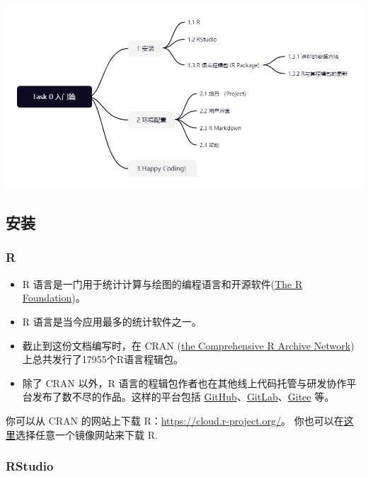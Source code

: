 \documentclass[]{ctexbook}
\providecommand{\tightlist}{%
  \setlength{\itemsep}{0pt}\setlength{\parskip}{0pt}}
\begin{document}
\includegraphics[width=1\textwidth,height=\textheight]{./image/task00_intro_structure.jpg}

\hypertarget{ux5b89ux88c5}{%
\subsection{安装}\label{ux5b89ux88c5}}

\hypertarget{r}{%
\subsubsection{R}\label{r}}

\begin{itemize}
\tightlist
\item
  R 语言是一门用于统计计算与绘图的编程语言和开源软件(\href{https://www.r-project.org/}{The R Foundation})。
\item
  R 语言是当今应用最多的统计软件之一。
\item
  截止到这份文档编写时，在 CRAN (\href{https://cran.r-project.org/}{the Comprehensive R Archive Network}) 上总共发行了17955个R语言程辑包。
\item
  除了 CRAN 以外，R 语言的程辑包作者也在其他线上代码托管与研发协作平台发布了数不尽的作品。这样的平台包括 \href{https://github.com/}{GitHub}、\href{https://about.gitlab.com}{GitLab}、\href{https://gitee.com/}{Gitee} 等。
\end{itemize}

你可以从 CRAN 的网站上下载 R：\url{https://cloud.r-project.org/}。
你也可以在\href{https://cran.r-project.org/mirrors.html}{这里}选择任意一个镜像网站来下载 R.

\hypertarget{rstudio}{%
\subsubsection{RStudio}\label{rstudio}}
\end{document}
